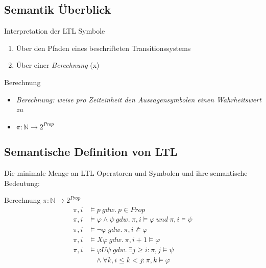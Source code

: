 \subsection{Semantik Überblick}
\begin{frame}{\insertsubsection}
    \begin{block}{Interpretation der LTL Symbole}
        \begin{enumerate}
        \setlength\itemsep{1em}
            \item Über den Pfaden eines beschrifteten Transitionssystems
            \item Über einer \textit{Berechnung} (x)
        \end{enumerate}
    \end{block}
    \begin{block}{Berechnung}
        \begin{itemize}
        \setlength\itemsep{1em}
            \item \textit{Berechnung: weise pro Zeiteinheit den Aussagensymbolen einen Wahrheitswert zu}
            \item $\pi : \mathbb{N} \rightarrow 2^{Prop}$
        \end{itemize}
    \end{block}
\end{frame}

\subsection{Semantische Definition von LTL}
\begin{frame}{\insertsubsection}
    Die minimale Menge an LTL-Operatoren und Symbolen und ihre semantische Bedeutung:
    \begin{block}{Berechnung $\pi : \mathbb{N} \rightarrow 2^{Prop}$}
    \vspace*{-1em}
    \begin{equation*}
        \begin{split}
            \pi, i &\models p\ gdw.\ p \in Prop\\
            \pi, i &\models \varphi \land \psi\ gdw.\ \pi, i \models \varphi\ und\ \pi, i \models \psi\\
            \pi, i &\models \lnot\varphi\ gdw.\ \pi, i \not\models \varphi\\
            \pi, i &\models X\varphi\ gdw.\ \pi, i+1 \models \varphi\\
            \pi, i &\models \varphi U\psi\ gdw.\ \exists j \geq i: \pi, j \models \psi \\
            &\ \ \ \ \land \forall k, i\leq k<j: \pi, k \models \varphi
        \end{split}
    \end{equation*}
    \end{block}
\end{frame}

